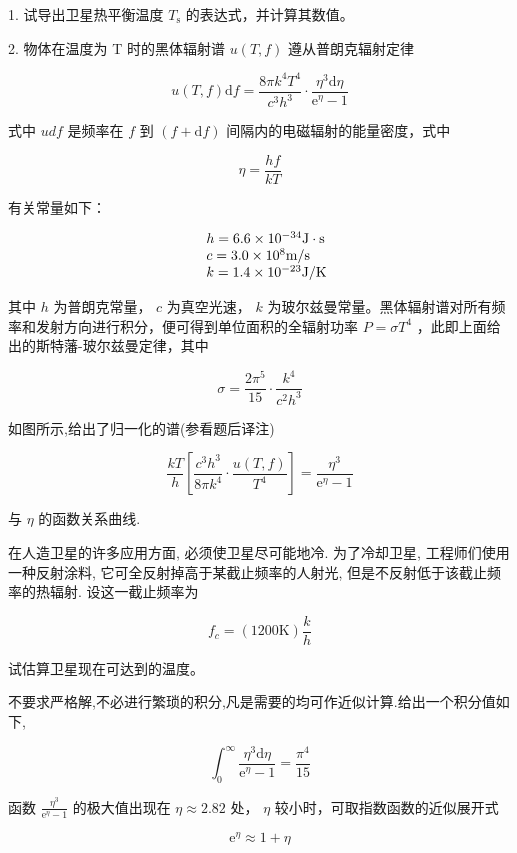 1. 试导出卫星热平衡温度 $T_{\mathrm{s}}$ 的表达式，并计算其数值。

2. 物体在温度为 T 时的黑体辐射谱 $u(T, f)$ 遵从普朗克辐射定律

$$
u (T, f) \mathrm{d} f = \frac {8 \pi k ^ {4} T ^ {4}}{c ^ {3} h ^ {3}} \cdot \frac {\eta^ {3} \mathrm{d} \eta}{\mathrm{e} ^ {\eta} - 1}
$$

式中 $udf$ 是频率在 $f$ 到 $(f + \mathrm{d}f)$ 间隔内的电磁辐射的能量密度，式中

$$
\eta = \frac {h f}{k T}
$$

有关常量如下：

$$
\begin{array}{r l} & h = 6. 6 \times 1 0 ^ {- 3 4} \mathrm{J} \cdot \mathrm{s} \\ & c = 3. 0 \times 1 0 ^ {8} \mathrm{m/s} \\ & k = 1. 4 \times 1 0 ^ {- 2 3} \mathrm{J/K} \end{array}
$$

其中 $h$ 为普朗克常量， $c$ 为真空光速， $k$ 为玻尔兹曼常量。黑体辐射谱对所有频率和发射方向进行积分，便可得到单位面积的全辐射功率 $P = \sigma T^4$ ，此即上面给出的斯特藩-玻尔兹曼定律，其中

$$
\sigma = \frac {2 \pi^ {5}}{1 5} \cdot \frac {k ^ {4}}{c ^ {2} h ^ {3}}
$$

如图所示,给出了归一化的谱(参看题后译注)

$$
\frac {k T}{h} \left[ \frac {c ^ {3} h ^ {3}}{8 \pi k ^ {4}} \cdot \frac {u (T , f)}{T ^ {4}} \right] = \frac {\eta^ {3}}{\mathrm{e} ^ {\eta} - 1}
$$

与 $\eta$ 的函数关系曲线.

在人造卫星的许多应用方面, 必须使卫星尽可能地冷. 为了冷却卫星, 工程师们使用一种反射涂料, 它可全反射掉高于某截止频率的人射光, 但是不反射低于该截止频率的热辐射. 设这一截止频率为

$$
f _ {c} = (1 2 0 0 \mathrm{K}) \frac {k}{h}
$$

试估算卫星现在可达到的温度。

不要求严格解,不必进行繁琐的积分,凡是需要的均可作近似计算.给出一个积分值如下,

$$
\int_ {0} ^ {\infty} \frac {\eta^ {3} \mathrm{d} \eta}{\mathrm{e} ^ {\eta} - 1} = \frac {\pi^ {4}}{1 5}
$$

函数 $\frac{\eta^3}{\mathrm{e}^{\eta} - 1}$ 的极大值出现在 $\eta \approx 2.82$ 处， $\eta$ 较小时，可取指数函数的近似展开式

$$
\mathrm{e} ^ {\eta} \approx 1 + \eta
$$

